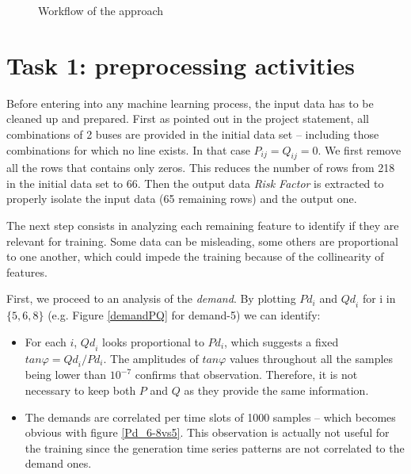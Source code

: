 \documentclass[11pt]{article}
\def\rf{\emph{Risk Factor }}
\begin{document}
    \begin{figure}[h]
        \centering
        
        \caption{\label{fig:workflow}Workflow of the approach}
    \end{figure}

    \pagebreak

\section{Task 1: preprocessing activities}
    Before entering into any machine learning process, the input data has to be cleaned up and prepared. First as pointed out in the project statement, all combinations of 2 buses are provided in the initial data set -- including those combinations for which no line exists. In that case $P_{ij}=Q_{ij}=0$. We first remove all the rows that contains only zeros. This reduces the number of rows from 218 in the initial data set to 66. Then the output data \rf is extracted to properly isolate the input data (65 remaining rows) and the output one.

    The next step consists in analyzing each remaining feature to identify if they are relevant for training. Some data can be misleading, some others are proportional to one another, which could impede the training because of the collinearity of features.  

    First, we proceed to an analysis of the \emph{demand}. By plotting ${Pd}_i$ and ${Qd}_i$ for i in $\{5, 6, 8\}$ (e.g. Figure \ref{demandPQ} for demand-5) we can identify:
    \begin{itemize}
        \item For each $i$, ${Qd}_i$ looks proportional to ${Pd}_i$, which suggests a fixed $tan{\varphi}={{Qd}_i}/{{Pd}_i}$. The amplitudes of $tan{\varphi}$ values throughout all the samples being lower than $10^{-7}$ confirms that observation. Therefore, it is not necessary to keep both $P$ and $Q$ as they provide the same information.
        \item The demands are correlated per time slots of 1000 samples -- which becomes obvious with figure \ref{Pd_6-8vs5}. This observation is actually not useful for the training since the generation time series patterns are not correlated to the demand ones.
    \end{itemize}
    
\end{document}
